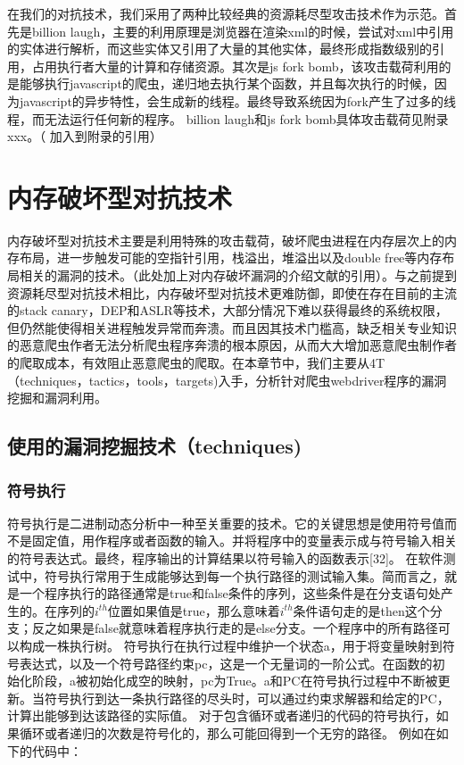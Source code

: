 \documentclass[doctor,privacy,twoside]{buaa_mac}
\begin{document}
在我们的对抗技术，我们采用了两种比较经典的资源耗尽型攻击技术作为示范。首先是billion laugh，主要的利用原理是浏览器在渲染xml的时候，尝试对xml中引用的实体进行解析，而这些实体又引用了大量的其他实体，最终形成指数级别的引用，占用执行者大量的计算和存储资源。其次是js fork bomb，该攻击载荷利用的是能够执行javascript的爬虫，递归地去执行某个函数，并且每次执行的时候，因为javascript的异步特性，会生成新的线程。最终导致系统因为fork产生了过多的线程，而无法运行任何新的程序。 billion laugh和js fork bomb具体攻击载荷见附录xxx。（ 加入到附录的引用）


\section{内存破坏型对抗技术}
内存破坏型对抗技术主要是利用特殊的攻击载荷，破坏爬虫进程在内存层次上的内存布局，进一步触发可能的空指针引用，栈溢出，堆溢出以及double free等内存布局相关的漏洞的技术。（此处加上对内存破坏漏洞的介绍文献的引用）。与之前提到资源耗尽型对抗技术相比，内存破坏型对抗技术更难防御，即使在存在目前的主流的stack canary，DEP和ASLR等技术，大部分情况下难以获得最终的系统权限，但仍然能使得相关进程触发异常而奔溃。而且因其技术门槛高，缺乏相关专业知识的恶意爬虫作者无法分析爬虫程序奔溃的根本原因，从而大大增加恶意爬虫制作者的爬取成本，有效阻止恶意爬虫的爬取。在本章节中，我们主要从4T（techniques，tactics，tools，targets)入手，分析针对爬虫webdriver程序的漏洞挖掘和漏洞利用。

\subsection{使用的漏洞挖掘技术（techniques)}

\subsubsection{符号执行}
符号执行是二进制动态分析中一种至关重要的技术。它的关键思想是使用符号值而不是固定值，用作程序或者函数的输入。并将程序中的变量表示成与符号输入相关的符号表达式。最终，程序输出的计算结果以符号输入的函数表示[32]。
在软件测试中，符号执行常用于生成能够达到每一个执行路径的测试输入集。简而言之，就是一个程序执行的路径通常是true和false条件的序列，这些条件是在分支语句处产生的。在序列的$i^{th}$位置如果值是true，那么意味着$i^{th}$条件语句走的是then这个分支；反之如果是false就意味着程序执行走的是else分支。一个程序中的所有路径可以构成一株执行树。
符号执行在执行过程中维护一个状态a，用于将变量映射到符号表达式，以及一个符号路径约束pc，这是一个无量词的一阶公式。在函数的初始化阶段，a被初始化成空的映射，pc为True。a和PC在符号执行过程中不断被更新。当符号执行到达一条执行路径的尽头时，可以通过约束求解器和给定的PC，计算出能够到达该路径的实际值。
对于包含循环或者递归的代码的符号执行，如果循环或者递归的次数是符号化的，那么可能回得到一个无穷的路径。 例如在如下的代码中：
\end{document}
